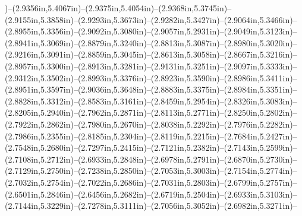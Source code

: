 )--(2.9356in,5.4067in)--(2.9375in,5.4054in)--(2.9368in,5.3745in)--(2.9155in,5.3858in)--(2.9293in,5.3673in)--(2.9282in,5.3427in)--(2.9064in,5.3466in)--(2.8955in,5.3356in)--(2.9092in,5.3080in)--(2.9057in,5.2931in)--(2.9049in,5.3123in)--(2.8941in,5.3069in)--(2.8879in,5.3240in)--(2.8813in,5.3087in)--(2.8980in,5.3020in)--(2.9216in,5.3091in)--(2.8859in,5.3045in)--(2.8613in,5.3058in)--(2.8667in,5.3216in)--(2.8957in,5.3300in)--(2.8913in,5.3281in)--(2.9131in,5.3251in)--(2.9097in,5.3333in)--(2.9312in,5.3502in)--(2.8993in,5.3376in)--(2.8923in,5.3590in)--(2.8986in,5.3411in)--(2.8951in,5.3597in)--(2.9036in,5.3648in)--(2.8883in,5.3375in)--(2.8984in,5.3351in)--(2.8828in,5.3312in)--(2.8583in,5.3161in)--(2.8459in,5.2954in)--(2.8326in,5.3083in)--(2.8205in,5.2940in)--(2.7962in,5.2871in)--(2.8113in,5.2771in)--(2.8250in,5.2802in)--(2.7922in,5.2862in)--(2.7980in,5.2670in)--(2.8038in,5.2292in)--(2.7976in,5.2282in)--(2.7986in,5.2355in)--(2.8185in,5.2304in)--(2.8119in,5.2215in)--(2.7684in,5.2427in)--(2.7548in,5.2680in)--(2.7297in,5.2415in)--(2.7121in,5.2382in)--(2.7143in,5.2599in)--(2.7108in,5.2712in)--(2.6933in,5.2848in)--(2.6978in,5.2791in)--(2.6870in,5.2730in)--(2.7129in,5.2750in)--(2.7238in,5.2850in)--(2.7053in,5.3003in)--(2.7154in,5.2774in)--(2.7032in,5.2754in)--(2.7022in,5.2686in)--(2.7031in,5.2803in)--(2.6799in,5.2757in)--(2.6501in,5.2846in)--(2.6456in,5.2682in)--(2.6719in,5.2504in)--(2.6933in,5.3103in)--(2.7144in,5.3229in)--(2.7278in,5.3111in)--(2.7056in,5.3052in)--(2.6982in,5.3271in)--
